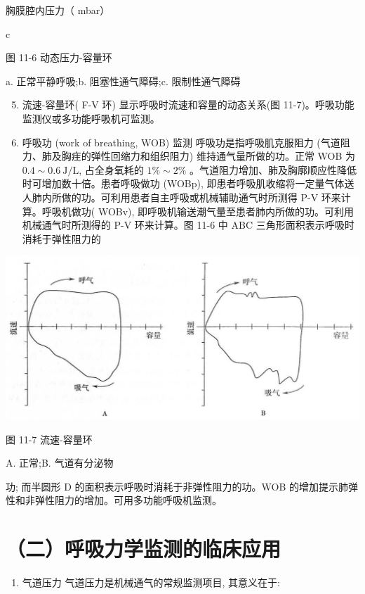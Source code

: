 \documentclass[10pt]{article}
\begin{document}
胸膜腔内压力（ mbar）

c

图 11-6 动态压力-容量环

a. 正常平静呼吸;b. 阻塞性通气障碍;c. 限制性通气障碍

\begin{enumerate}
  \setcounter{enumi}{4}
  \item 流速-容量环( F-V 环) 显示呼吸时流速和容量的动态关系(图 11-7)。呼吸功能监测仪或多功能呼吸机可监测。

  \item 呼吸功 (work of breathing, WOB) 监测 呼吸功是指呼吸肌克服阻力 (气道阻力、肺及胸疰的弹性回缩力和组织阻力) 维持通气量所做的功。正常 WOB 为 $0.4 \sim 0.6 \mathrm{~J} / \mathrm{L}$, 占全身氧耗的 $1 \% \sim 2 \%$ 。气道阻力增加、肺及胸廓顺应性降低时可增加数十倍。患者呼吸做功 (WOBp), 即患者呼吸肌收缩将一定量气体送人肺内所做的功。可利用患者自主呼吸或机械辅助通气时所测得 P-V 环来计算。呼吸机做功( WOBv), 即呼吸机输送潮气量至患者肺内所做的功。可利用机械通气时所测得的 P-V 环来计算。图 11-6 中 ABC 三角形面积表示呼吸时消耗于弹性阻力的

\end{enumerate}

\begin{center}
\includegraphics[max width=\textwidth]{2024_07_09_002a177993bd97d1d6d7g-125}
\end{center}

图 11-7 流速-容量环

A. 正常;B. 气道有分泌物

功; 而半圆形 D 的面积表示呼吸时消耗于非弹性阻力的功。WOB 的增加提示肺弹性和非弹性阻力的增加。可用多功能呼吸机监测。

\section*{（二）呼吸力学监测的临床应用}
\begin{enumerate}
  \item 气道压力 气道压力是机械通气的常规监测项目, 其意义在于:
\end{enumerate}
\end{document}
